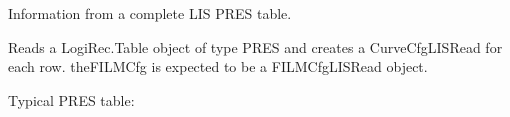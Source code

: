 \documentclass[letterpaper,10pt,english]{sphinxmanual}
\begin{document}
\begin{fulllineitems}
\label{\detokenize{ref/util/plot/PRESCfg:TotalDepth.util.plot.PRESCfg.PresCfgLISRead}}
Information from a complete LIS PRES table.

\begin{fulllineitems}
\label{\detokenize{ref/util/plot/PRESCfg:TotalDepth.util.plot.PRESCfg.PresCfgLISRead.__init__}}
Reads a LogiRec.Table object of type PRES and creates a
CurveCfgLISRead for each row. theFILMCfg is expected to be a
FILMCfgLISRead object.

Typical PRES table:


\end{fulllineitems}
\end{fulllineitems}
\end{document}
